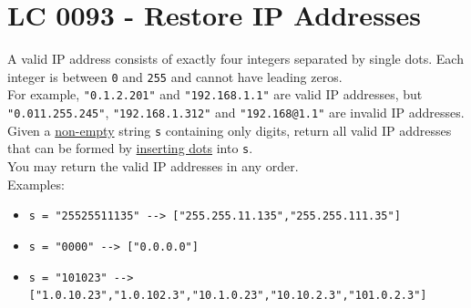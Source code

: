\section{LC 0093 - Restore IP Addresses}
A valid IP address consists of exactly four integers separated by single dots. Each integer is between {\colorbox{CodeBackground}{\lstinline|0|}} and {\colorbox{CodeBackground}{\lstinline|255|}} and cannot have leading zeros.\\

For example, {\colorbox{CodeBackground}{\lstinline|"0.1.2.201"|}} and {\colorbox{CodeBackground}{\lstinline|"192.168.1.1"|}} are valid IP addresses, but {\colorbox{CodeBackground}{\lstinline|"0.011.255.245"|}}, {\colorbox{CodeBackground}{\lstinline|"192.168.1.312"|}} and {\colorbox{CodeBackground}{\lstinline|"192.168@1.1"|}} are invalid IP addresses.\\

Given a \ul{non-empty} string {\colorbox{CodeBackground}{\lstinline|s|}} containing only digits, return all valid IP addresses that can be formed by \ul{inserting dots} into {\colorbox{CodeBackground}{\lstinline|s|}}.\\

You may return the valid IP addresses in any order. \\

Examples:
\begin{itemize}
	\item {\colorbox{CodeBackground}{\lstinline|s = "25525511135" --> ["255.255.11.135","255.255.111.35"]|}}
	\item {\colorbox{CodeBackground}{\lstinline|s = "0000" --> ["0.0.0.0"]|}}
	\item {\colorbox{CodeBackground}{\lstinline|s = "101023" --> ["1.0.10.23","1.0.102.3","10.1.0.23","10.10.2.3","101.0.2.3"]|}}
\end{itemize}

